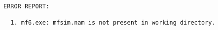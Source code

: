 {\small
\begin{lstlisting}[style=modeloutput]

ERROR REPORT:

  1. mf6.exe: mfsim.nam is not present in working directory.


\end{lstlisting}
}

